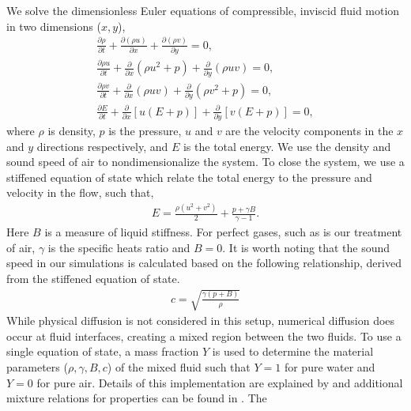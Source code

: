 We solve the dimensionless Euler equations of compressible, inviscid
fluid motion in two dimensions ($x,y$),
\begin{subequations} \label{eq:euler}
  \begin{align} 
    \frac{\partial \rho}{\partial t} + \frac{\partial \left(\rho u\right)}{\partial x} + \frac{\partial \left(\rho v\right)}{\partial y} = 0,\\
    \frac{\partial \rho u}{\partial t} + \frac{\partial}{\partial x}\left( \rho u^2+p\right)  + \frac{\partial}{\partial y}\left( \rho uv\right) = 0,\\
    \frac{\partial \rho v}{\partial t} + \frac{\partial}{\partial x}\left( \rho uv\right)  + \frac{\partial}{\partial y}\left( \rho v^2+p\right) = 0,\\
    \frac{\partial E}{\partial t} + \frac{\partial}{\partial x}\left[u\left(E+p\right)\right] + \frac{\partial}{\partial y}\left[v\left(E+p\right)\right] = 0,
  \end{align}
\end{subequations}
where $\rho$ is density, $p$ is the pressure, $u$ and $v$ are the
velocity components in the $x$ and $y$ directions respectively, and
$E$ is the total energy. We use the density and sound speed of air to
nondimensionalize the system. To close the system, we use a stiffened
equation of state which relate the total energy to the pressure and
velocity in the flow, such that,
\begin{align}\label{eq:stiffened_eos}
  E=\frac{\rho\left(u^2+v^2\right)}{2} + \frac{p+\gamma B}{\gamma-1}.
\end{align}
Here $B$ is a measure of liquid stiffness. For perfect gases, such as
is our treatment of air, $\gamma$ is the specific heats ratio and
$B=0$. It is worth noting that the sound speed in our simulations is
calculated based on the following relationship, derived from the
stiffened equation of state.
\begin{align}
  c = \sqrt{\frac{\gamma\left(p+B\right)}{\rho}}
\end{align}
While physical diffusion is not considered in this setup, numerical
diffusion does occur at fluid interfaces, creating a mixed region
between the two fluids. To use a single equation of state, a mass
fraction $Y$ is used to determine the material parameters
($\rho, \gamma, B, c$) of the mixed fluid such that $Y=1$ for pure
water and $Y=0$ for pure air. Details of this implementation are
explained by \cite{HenrydeFrahan2015} and additional mixture relations
for properties can be found in \cite{Ward2010}. The
